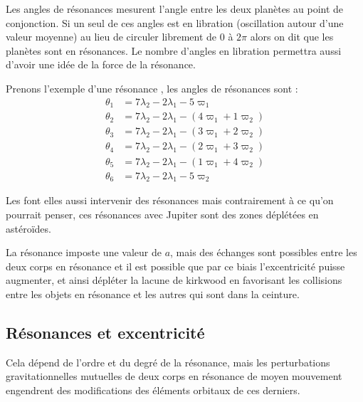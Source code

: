 Les angles de résonances mesurent l'angle entre les deux planètes au point de conjonction. Si un seul de ces angles est en
libration (oscillation autour d'une valeur moyenne) au lieu de circuler librement de $0$ à $2\pi$ alors on dit que les planètes
sont en résonances. Le nombre d'angles en libration permettra aussi d'avoir une idée de la force de la résonance.

Prenons l'exemple d'une résonance , les angles de résonances sont :
\begin{align*}
\theta_1 &= 7 \lambda_2 -2\lambda_1 - 5 \varpi_1\\
\theta_2 &= 7 \lambda_2 -2\lambda_1 - \left( 4 \varpi_1 + 1\varpi_2 \right)\\
\theta_3 &= 7 \lambda_2 -2\lambda_1 - \left( 3 \varpi_1 + 2\varpi_2 \right)\\
\theta_4 &= 7 \lambda_2 -2\lambda_1 - \left( 2 \varpi_1 + 3\varpi_2 \right)\\
\theta_5 &= 7 \lambda_2 -2\lambda_1 - \left( 1 \varpi_1 + 4\varpi_2 \right)\\
\theta_6 &= 7 \lambda_2 -2\lambda_1 - 5 \varpi_2
\end{align*}

\bigskip

Les  font elles aussi intervenir des résonances mais contrairement à ce
qu'on pourrait penser, ces résonances avec Jupiter sont des zones déplétées en astéroïdes. 

La résonance imposte une valeur de $a$, mais des échanges sont possibles entre les deux corps en résonance et il est possible
que par ce biais l'excentricité puisse augmenter, et ainsi dépléter la lacune de kirkwood en favorisant les collisions entre les
objets en résonance et les autres qui sont dans la ceinture.


\subsection{Résonances et excentricité}
Cela dépend de l'ordre et du degré de la résonance, mais les perturbations gravitationnelles mutuelles de deux corps en
résonance de moyen mouvement engendrent des modifications des éléments orbitaux de ces derniers. 


